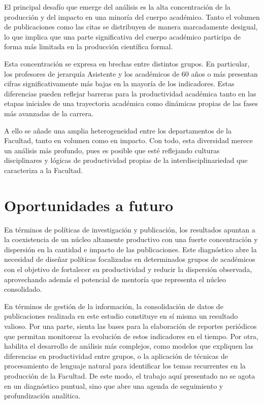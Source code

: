 \documentclass[
  a4paper,
  oneside]{scrbook}
\begin{document}
El principal desafío que emerge del análisis es la alta concentración de
la producción y del impacto en una minoría del cuerpo académico. Tanto
el volumen de publicaciones como las citas se distribuyen de manera
marcadamente desigual, lo que implica que una parte significativa del
cuerpo académico participa de forma más limitada en la producción
científica formal.

Esta concentración se expresa en brechas entre distintos grupos. En
particular, los profesores de jerarquía Asistente y los académicos de 60
años o más presentan cifras significativamente más bajas en la mayoría
de los indicadores. Estas diferencias pueden reflejar barreras para la
productividad académica tanto en las etapas iniciales de una trayectoria
académica como dinámicas propias de las fases más avanzadas de la
carrera.

A ello se añade una amplia heterogeneidad entre los departamentos de la
Facultad, tanto en volumen como en impacto. Con todo, esta diversidad
merece un análisis más profundo, pues es posible que esté reflejando
culturas disciplinares y lógicas de productividad propias de la
interdisciplinariedad que caracteriza a la Facultad.

\section{Oportunidades a futuro}\label{oportunidades-a-futuro-1}

En términos de políticas de investigación y publicación, los resultados
apuntan a la coexistencia de un núcleo altamente productivo con una
fuerte concentración y dispersión en la cantidad e impacto de las
publicaciones. Este diagnóstico abre la necesidad de diseñar políticas
focalizadas en determinados grupos de académicos con el objetivo de
fortalecer su productividad y reducir la dispersión observada,
aprovechando además el potencial de mentoría que representa el núcleo
consolidado.

En términos de gestión de la información, la consolidación de datos de
publicaciones realizada en este estudio constituye en sí misma un
resultado valioso. Por una parte, sienta las bases para la elaboración
de reportes periódicos que permitan monitorear la evolución de estos
indicadores en el tiempo. Por otra, habilita el desarrollo de análisis
más complejos, como modelos que expliquen las diferencias en
productividad entre grupos, o la aplicación de técnicas de procesamiento
de lenguaje natural para identificar los temas recurrentes en la
producción de la Facultad. De este modo, el trabajo aquí presentado no
se agota en un diagnóstico puntual, sino que abre una agenda de
seguimiento y profundización analítica.
\end{document}
